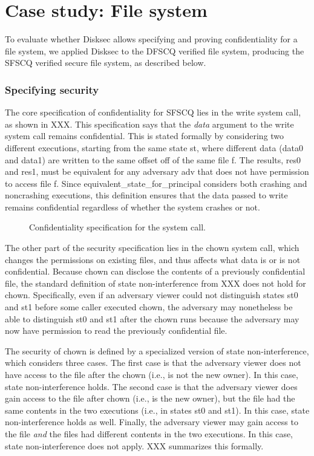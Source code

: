 \chapter{Case study: File system}
\label{s:fs}

To evaluate whether Disksec allows specifying and proving confidentiality
for a file system, we applied Disksec to the DFSCQ verified file system,
producing the SFSCQ verified secure file system, as described below.


\subsection{Specifying security}

The core specification of confidentiality for SFSCQ lies in the
write system call, as shown in XXX.  This
specification says that the \emph{data} argument to the {write}
system call remains confidential.  This is stated formally by
considering two different executions, starting from the same
state {st}, where different data ({data0} and {data1})
are written to the same offset {off} of the same file {f}.
The results, {res0} and {res1}, must be equivalent for any
adversary {adv} that does not have permission to access file {f}.
Since {equivalent\_state\_for\_principal} considers both crashing and
noncrashing executions, this definition ensures that the data passed to
{write} remains confidential regardless of whether the system crashes
or not.

\begin{figure}[ht]
  
  \caption{Confidentiality specification for the  system call.}
  \label{fig:writespec}
\end{figure}

The other part of the security specification lies in the {chown}
system call, which changes the permissions on existing files, and thus
affects what data is or is not confidential.  Because {chown} can
disclose the contents of a previously confidential file, the standard
definition of state non-interference from XXX
does not hold for {chown}.  Specifically, even if an adversary
{viewer} could not distinguish states {st0} and {st1} before some
{caller} executed {chown}, the adversary may nonetheless be able
to distinguish {st0} and {st1} after the {chown} runs because
the adversary may now have permission to read the previously confidential
file.

The security of {chown} is defined by a specialized version of
state non-interference, which considers three cases.  The first case
is that the adversary {viewer} does not have access to the file
after the {chown} (i.e., is not the new owner).
In this case, state non-interference holds.
The second case is that the adversary {viewer} does gain access to
the file after {chown} (i.e., is the new owner),
but the file had the same contents in the
two executions (i.e., in states {st0} and {st1}).  In this case,
state non-interference holds as well.  Finally, the adversary {viewer}
may gain access to the file \emph{and} the files had different contents in
the two executions.  In this case, state non-interference does not apply.
XXX summarizes this formally.

